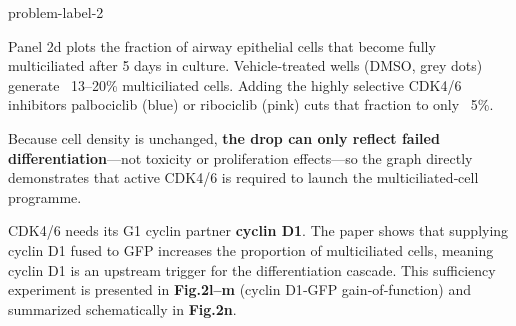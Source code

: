 \begin{problem}{}{problem-label-2}


Panel 2d plots the fraction of airway epithelial cells that become fully multiciliated after 5 days in culture. Vehicle‑treated wells (DMSO, grey dots) generate ~13–20\% multiciliated cells. Adding the highly selective CDK4/6 inhibitors palbociclib (blue) or ribociclib (pink) cuts that fraction to only ~5\%.

Because cell density is unchanged, \textbf{the drop can only reflect failed differentiation}—not toxicity or proliferation effects—so the graph directly demonstrates that active CDK4/6 is required to launch the multiciliated‑cell programme.

CDK4/6 needs its G1 cyclin partner \textbf{cyclin D1}.
The paper shows that supplying cyclin D1 fused to GFP increases the proportion of multiciliated cells, meaning cyclin D1 is an upstream trigger for the differentiation cascade. This sufficiency experiment is presented in \textbf{Fig.2l–m} (cyclin D1‑GFP gain‑of‑function) and summarized schematically in \textbf{Fig.2n}.

\end{problem}





















